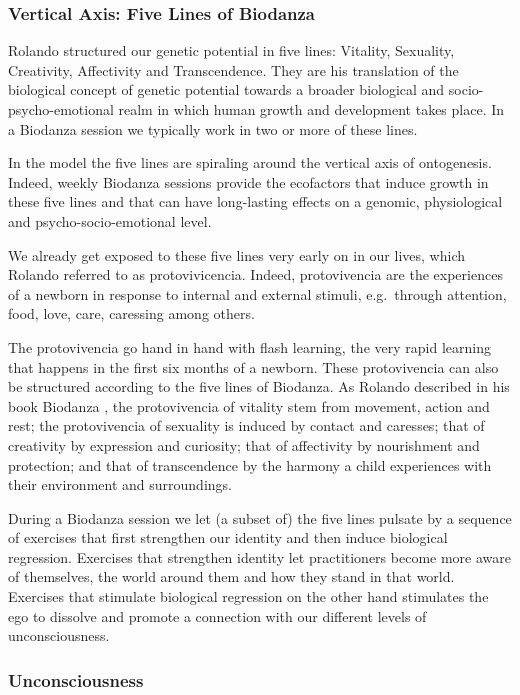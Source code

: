 \documentclass[
  11pt,
]{book}
\begin{document}
\hypertarget{vertical-axis-five-lines-of-biodanza}{%
\subsubsection{Vertical Axis: Five Lines of Biodanza}\label{vertical-axis-five-lines-of-biodanza}}

Rolando structured our genetic potential in five lines: Vitality, Sexuality, Creativity, Affectivity and Transcendence. They are his translation of the biological concept of genetic potential towards a broader biological and socio-psycho-emotional realm in which human growth and development takes place.
In a Biodanza session we typically work in two or more of these lines.

In the model the five lines are spiraling around the vertical axis of ontogenesis. Indeed, weekly Biodanza sessions provide the ecofactors that induce growth in these five lines and that can have long-lasting effects on a genomic, physiological and psycho-socio-emotional level.

We already get exposed to these five lines very early on in our lives, which Rolando referred to as protovivicencia. Indeed, protovivencia are the experiences of a newborn in response to internal and external stimuli, e.g.~through attention, food, love, care, caressing among others.

The protovivencia go hand in hand with flash learning, the very rapid learning that happens in the first six months of a newborn. These protovivencia can also be structured according to the five lines of Biodanza. As Rolando described in his book Biodanza \citep{toro2008}, the protovivencia of vitality stem from movement, action and rest; the protovivencia of sexuality is induced by contact and caresses; that of creativity by expression and curiosity; that of affectivity by nourishment and protection; and that of transcendence by the harmony a child experiences with their environment and surroundings.

During a Biodanza session we let (a subset of) the five lines pulsate by a sequence of exercises that first strengthen our identity and then induce biological regression.
Exercises that strengthen identity let practitioners become more aware of themselves, the world around them and how they stand in that world. Exercises that stimulate biological regression on the other hand stimulates the ego to dissolve and promote a connection with our different levels of unconsciousness.

\hypertarget{unconsciousness}{%
\subsubsection{Unconsciousness}\label{unconsciousness}}
\end{document}
